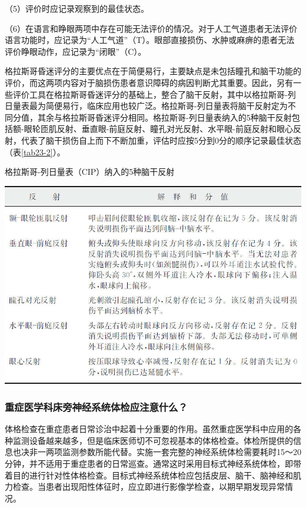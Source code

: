（5）评价时应记录观察到的最佳状态。

（6）在语言和睁眼两项中存在可能无法评价的情况。对于人工气道患者无法评价语言功能时，应记录为“人工气道”（T）。眼部直接损伤、水肿或麻痹的患者无法评价睁眼动作，应记录为“闭眼”（C）。

格拉斯哥昏迷评分的主要优点在于简便易行，主要缺点是未包括瞳孔和脑干功能的评价，而这两项内容对于脑损伤患者意识障碍的病因判断尤其重要。因此，另有一些评价工具在格拉斯哥昏迷评分的基础上，整合了脑干反射，其中以格拉斯哥-列日量表最为简便易行，临床应用也较广泛。格拉斯哥-列日量表将脑干反射定为不同分值，其余与格拉斯哥昏迷评分相同。格拉斯哥-列日量表纳入的5种脑干反射包括额-眼轮匝肌反射、垂直眼-前庭反射、瞳孔对光反射、水平眼-前庭反射和眼心反射，代表了脑干损伤自上而下不断加重，评估时应按5分到0分的顺序记录最佳状态（表\ref{tab23-2}）。

\begin{table}[htbp]
\centering
\caption{格拉斯哥-列日量表（CIP）纳入的5种脑干反射}
\label{tab23-2}
\includegraphics{./images/Image00263.jpg}
\end{table}

\subsubsection{重症医学科床旁神经系统体检应注意什么？}

体格检查在重症患者日常诊治中起着十分重要的作用。虽然重症医学科中应用的各种监测设备越来越多，但是临床医师切不可忽视基本的体格检查。体检所提供的信息也决非一两项监测参数所能代替。实施一套完整的神经系统体检需要耗时15～20分钟，并不适用于重症患者的日常巡查。通常这时采用目标式神经系统体检，即带着目的进行针对性体格检查。目标式神经系统体检应包括皮层、脑干、脑神经和肌力检查。当患者出现阳性体征时，应立即进行影像学检查，以期早期发现异常情况。

